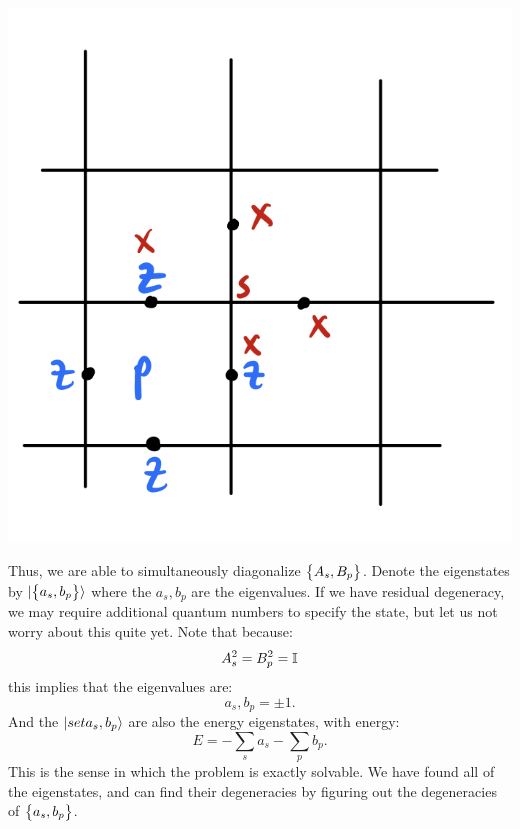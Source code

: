 \begin{center}
    \includegraphics[scale=0.4]{Lectures/Images/lec1-toricopcommute.png}
\end{center}

Thus, we are able to simultaneously diagonalize $\set{A_s, B_p}$. Denote the eigenstates by $\lvert \set{a_s, b_p} \rangle$ where the $a_s, b_p$ are the eigenvalues. If we have residual degeneracy, we may require additional quantum numbers to specify the state, but let us not worry about this quite yet. Note that because:
\begin{equation}
    A_s^2 = B_p^2 = \mathbb{I}
\end{equation}
this implies that the eigenvalues are:
\begin{equation}
    a_s, b_p = \pm 1.
\end{equation}
And the $\lvert set{a_s, b_p} \rangle$ are also the energy eigenstates, with energy:
\begin{equation}
    E = -\sum_s a_s - \sum_p b_p.
\end{equation}
This is the sense in which the problem is exactly solvable. We have found all of the eigenstates, and can find their degeneracies by figuring out the degeneracies of $\set{a_s, b_p}$.

